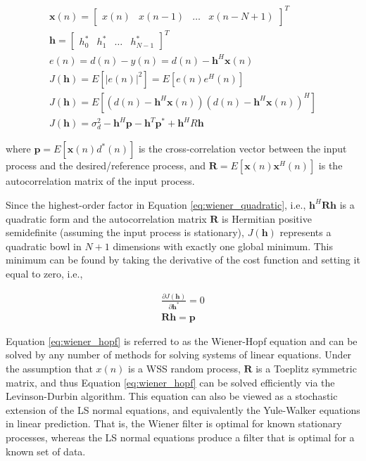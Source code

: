 \begin{eqnarray}
	\boldsymbol{x}(n) = 
	\begin{bmatrix}
		x(n) & x(n-1) & \dots & x(n-N+1)
	\end{bmatrix}^T \\
	\boldsymbol{h} = 
	\begin{bmatrix}
		h_0^* & h_1^* & \dots & h_{N-1}^*
	\end{bmatrix}^T \\
	e(n)=d(n) - y(n) = d(n) - \boldsymbol{h}^H\boldsymbol{x}(n) \\
	J(\boldsymbol{h}) = E\left[ \left| e(n) \right|^2 \right] = E\left[e(n)e^H(n)\right] \\
	J(\boldsymbol{h}) = E\left[
	\left(d(n) - \boldsymbol{h}^H\boldsymbol{x}(n)\right)
	\left(d(n) - \boldsymbol{h}^H\boldsymbol{x}(n)\right)^H
	\right] \label{eq:wiener_cost_fn_0} \\
	J(\boldsymbol{h}) = \sigma_d^2 - \boldsymbol{h}^H\boldsymbol{p} - \boldsymbol{h}^T\boldsymbol{p}^*+\boldsymbol{h}^H R \boldsymbol{h} \label{eq:wiener_quadratic}
\end{eqnarray}

\noindent
where $\boldsymbol{p} = E \left[ \boldsymbol{x}(n)d^*(n) \right]$ is the cross-correlation vector between the input process and the desired/reference process, and $\boldsymbol{R} = E \left[ \boldsymbol{x}(n)\boldsymbol{x}^H (n) \right]$ is the autocorrelation matrix of the input process.

Since the highest-order factor in Equation \ref{eq:wiener_quadratic}, i.e., $\boldsymbol{h}^H \boldsymbol{R} \boldsymbol{h}$ is a quadratic form and the autocorrelation matrix $\boldsymbol{R}$ is Hermitian positive semidefinite (assuming the input process is stationary), $J(\boldsymbol{h})$ represents a quadratic bowl in $N+1$ dimensions with exactly one global minimum. This minimum can be found by taking the derivative of the cost function and setting it equal to zero, i.e.,


\begin{eqnarray}
	\frac{\partial J(\boldsymbol{h})}{\partial \boldsymbol{h}^*}=0 \\
	\boldsymbol{R} \boldsymbol{h} = \boldsymbol{p} \label{eq:wiener_hopf}
\end{eqnarray}

Equation \ref{eq:wiener_hopf} is referred to as the Wiener-Hopf equation and can be solved by any number of methods for solving systems of linear equations. Under the assumption that $x(n)$ is a WSS random process, $\boldsymbol{R}$ is a Toeplitz symmetric matrix, and thus Equation \ref{eq:wiener_hopf} can be solved efficiently via the Levinson-Durbin algorithm. This equation can also be viewed as a stochastic extension of the LS normal equations, and equivalently the Yule-Walker equations in linear prediction. That is, the Wiener filter is optimal for known stationary processes, whereas the LS normal equations produce a filter that is optimal for a known set of data. 

